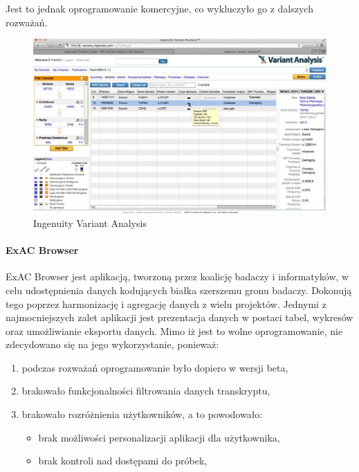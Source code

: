 \documentclass[a4paper,12pt,twoside]{article}
\begin{document}
Jest to jednak oprogramowanie komercyjne, co wykluczyło go z dalszych
rozważań.

\begin{figure}[H]
\includegraphics[width=\linewidth]{obrazy/exac/ingenuity.jpg}
\caption{Ingenuity Variant Analysis \cite{ingenuity}}
\label{fig:ingenuitypic}
\end{figure}
\newpage

\paragraph{ExAC Browser} ExAC Browser \cite{exac} \cite{exacCite} jest aplikacją, tworzoną przez koalicję badaczy i informatyków, w celu
udostępnienia danych kodujących białka szerszemu gronu badaczy.
Dokonują tego poprzez harmonizację i agregację danych z wielu projektów.
Jednymi z najmocniejszych zalet aplikacji jest prezentacja danych w postaci tabel, wykresów oraz umożliwianie eksportu danych.
Mimo iż jest to wolne oprogramowanie, nie zdecydowano się na jego wykorzystanie, ponieważ:
\begin{enumerate}[1)]
\item podczas rozważań oprogramowanie było dopiero w wersji beta,
\item brakowało funkcjonalności filtrowania danych transkryptu,
\item brakowało rozróżnienia użytkowników, a to powodowało:
\begin{itemize}
\item brak możliwości personalizacji aplikacji dla użytkownika,
\item brak kontroli nad dostępami do próbek,
\end{itemize}
\end{enumerate}
\end{document}
